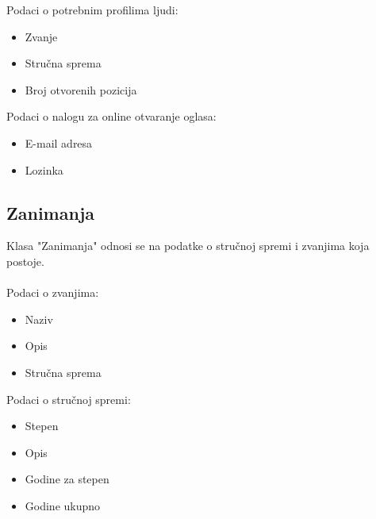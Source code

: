 \noindent Podaci o potrebnim profilima ljudi:
\begin{itemize}
	\item Zvanje
	\item Stru\v cna sprema
	\item Broj otvorenih pozicija
\end{itemize}

\noindent Podaci o nalogu za online otvaranje oglasa:
\begin{itemize}
	\item E-mail adresa
	\item Lozinka
\end{itemize}


\subsection{Zanimanja}
Klasa "Zanimanja" odnosi se na podatke o stru\v cnoj spremi i zvanjima koja postoje.
\\
\\ Podaci o zvanjima:
\begin{itemize}
	\item Naziv
	\item Opis
	\item Stru\v cna sprema
\end{itemize}

\noindent Podaci o stru\v cnoj spremi:
\begin{itemize}
	\item Stepen
	\item Opis
	\item Godine za stepen
	\item Godine ukupno
\end{itemize}
